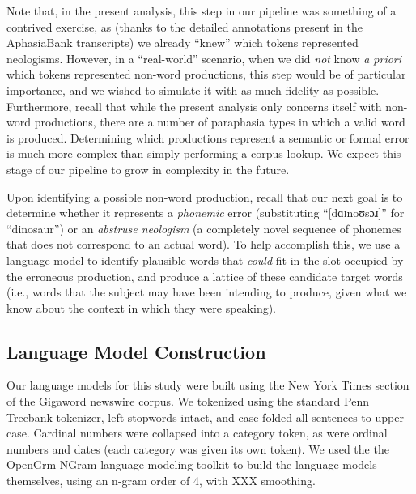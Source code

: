 Note that, in the present analysis, this step in our pipeline was something of a contrived exercise, as (thanks to the detailed annotations present in the AphasiaBank transcripts) we already ``knew'' which tokens represented neologisms.
However, in a ``real-world'' scenario, when we did \emph{not} know \emph{a priori} which tokens represented non-word productions, this step would be of particular importance, and we wished to simulate it with as much fidelity as possible.
Furthermore, recall that while the present analysis only concerns itself with non-word productions, there are a number of paraphasia types in which a valid word is produced.
Determining which productions represent a semantic or formal error is much more complex than simply performing a corpus lookup.
We expect this stage of our pipeline to grow in complexity in the future.

Upon identifying a possible non-word production, recall that our next goal is to determine whether it represents a \emph{phonemic} error (substituting ``[dɑɪnoʊsɔɹ]'' for ``dinosaur'') or an \emph{abstruse neologism} (a completely novel sequence of phonemes that does not correspond to an actual word).
To help accomplish this, we use a language model to identify plausible words that \emph{could} fit in the slot occupied by the erroneous production, and produce a lattice of these candidate target words (i.e., words that the subject may have been intending to produce, given what we know about the context in which they were speaking).


\subsection{Language Model Construction} %
\label{sub:language_model_construction}

Our language models for this study were built using the New York Times section of the Gigaword newswire corpus. %
We tokenized using the standard Penn Treebank tokenizer, left stopwords intact, and case-folded all sentences to upper-case.
Cardinal numbers were collapsed into a category token, as were ordinal numbers and dates (each category was given its own token).
We used the the OpenGrm-NGram language modeling toolkit \cite{RoarkOpenGRM} to build the language models themselves, using an n-gram order of 4, with XXX smoothing. %

